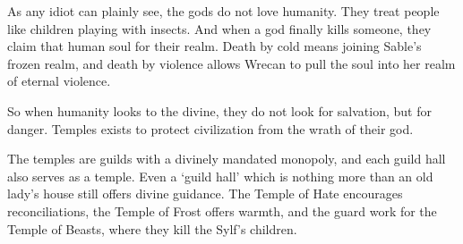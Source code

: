 \begin{multicols}{2}

\label{godsOfDeath}

\noindent
As any idiot can plainly see, the gods do not love humanity.
They treat people like children playing with insects.
And when a god finally kills someone, they claim that human soul for their realm.
Death by cold means joining Sable's frozen realm, and death by violence allows Wrecan to pull the soul into her realm of eternal violence.

So when humanity looks to the divine, they do not look for salvation, but for danger.
Temples exists to protect civilization from the wrath of their god.

The temples are guilds with a divinely mandated monopoly, and each guild hall also serves as a temple.
Even a `guild hall' which is nothing more than an old lady's house still offers divine guidance.
The Temple of Hate encourages reconciliations, the Temple of Frost offers warmth, and the \gls{guard} work for the Temple of Beasts, where they kill the Sylf's children.

\newcommand\guild[8]{
  \renewcommand\npcsymbol{#2}
  \vspace{2em}
  \noindent
  \begin{minipage}{\linewidth}
  \subsection[The Temple of #3]{#2~#1~#2 \\ \& \\ The Temple of #3}
  \ifdefmacro{#1}{}{\index{#1}\label{god:#1}}
  \index{#3 (God)}\label{god:#3}
  \ifdefmacro{#7}{}{\index{#7}\label{guild:#7}}
  \index{Gods}

  \begin{exampletext}
  \noindent
  #4
  \end{exampletext}
  \end{minipage}

  \noindent
  \begin{minipage}{\linewidth}
  \begin{description}
  \item[Domain:] #5

  \item[Defence:] #6

  \item[Watchers:] #7

  \item[Activities:] #8


\end{description}
\end{minipage}}
\end{multicols}
